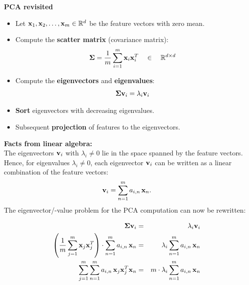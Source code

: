 	\textbf {PCA revisited}  

	\begin{itemize}
		\item Let $\bm{\mathrm{x}}_1, \bm{\mathrm{x}}_2, \dots, \bm{\mathrm{x}}_m\in \mathbb{R}^d$ be the feature vectors with zero mean.  
		\item Compute the   \textbf{scatter matrix} (covariance matrix):
		      \begin{displaymath}
			      \mathbf{\Sigma} =
			      \frac{1}{m}\sum_{i=1}^m \bm{\mathrm{x}}_i \bm{\mathrm{x}}_i^T \quad
			      \in \quad \mathbb{R}^{d\times d}  
		      \end{displaymath}
		\item Compute the   \textbf{eigenvectors} and   \textbf{eigenvalues}:
		      \begin{displaymath}
			      \mathbf{\Sigma} \bm{\mathrm{v}}_i = \lambda_i \bm{\mathrm{v}}_i  
		      \end{displaymath}
		\item   \textbf{Sort} eigenvectors with decreasing eigenvalues.  
		\item Subsequent   \textbf{projection} of features to the eigenvectors.
	\end{itemize}
  	\textbf {Facts from linear algebra:} \\ 

	The eigenvectors $\bm{\mathrm{v}}_i$ with $\lambda_i\neq 0$ lie in the space spanned by the feature vectors. Hence, for eigenvalues $\lambda_i\neq 0$, each eigenvector $\bm{\mathrm{v}}_i$ can be written as a linear combination of the feature vectors:
		      \begin{displaymath}
			      \bm{\mathrm{v}}_i = \sum_{n=1}^m a_{i,n} \, \bm{\mathrm{x}}_n.
		      \end{displaymath}
   The eigenvector/-value problem for the PCA computation can now be rewritten:

	\begin{eqnarray*}
		\mathbf{\Sigma} \bm{\mathrm{v}}_i
		&=& \lambda_i \bm{\mathrm{v}}_i \\  
		\left( \frac{1}{m}\sum_{j=1}^m \bm{\mathrm{x}}_j \bm{\mathrm{x}}_j^T\right) \cdot \sum_{n=1}^m a_{i,n} \, \bm{\mathrm{x}}_n
		&=& \lambda_i \sum_{n=1}^m a_{i,n} \, \bm{\mathrm{x}}_n \\ 
		\sum_{j=1}^m\sum_{n=1}^m a_{i,n} \, \bm{\mathrm{x}}_j \bm{\mathrm{x}}_j^T\bm{\mathrm{x}}_n
		&=& m \cdot \lambda_i \sum_{n=1}^m a_{i,n} \, \bm{\mathrm{x}}_n
	\end{eqnarray*}
     
